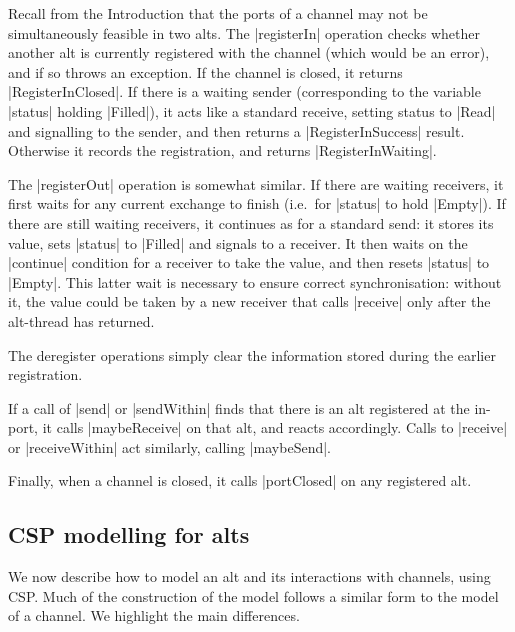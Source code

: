 Recall from the Introduction that the ports of a channel may not be
simultaneously feasible in two alts.
The |registerIn| operation checks whether another alt is currently registered
with the channel (which would be an error), and if so throws an exception.  If
the channel is closed, it returns |RegisterInClosed|.  If there is a waiting
sender (corresponding to the variable |status| holding |Filled|), it acts like
a standard receive, setting status to |Read| and signalling to the sender, and
then returns a |RegisterInSuccess| result.  Otherwise it records the
registration, and returns |RegisterInWaiting|.

The |registerOut| operation is somewhat similar.  If there are waiting
receivers, it first waits for any current exchange to finish (i.e.~for
|status| to hold |Empty|).  If there are still waiting receivers, it continues
as for a standard send: it stores its value, sets |status| to |Filled| and
signals to a receiver.  It then waits on the |continue| condition for a
receiver to take the value, and then resets |status| to |Empty|.  This latter
wait is necessary to ensure correct synchronisation: without it, the value
could be taken by a new receiver that calls |receive| only after the
alt-thread has returned.

The deregister operations simply clear the information stored during the
earlier registration.

If a call of |send| or |sendWithin| finds that there is an alt registered at
the in-port, it calls |maybeReceive| on that alt, and reacts accordingly.
Calls to |receive| or |receiveWithin| act similarly, calling |maybeSend|.  

Finally, when a channel is closed, it calls |portClosed| on any registered alt. 


\subsection{CSP modelling for alts}

\inlineCSP

We now describe how to model an alt and its interactions with channels, using
CSP\@.  Much of the construction of the model follows a similar form to the
model of a channel.  We highlight the main differences. 

